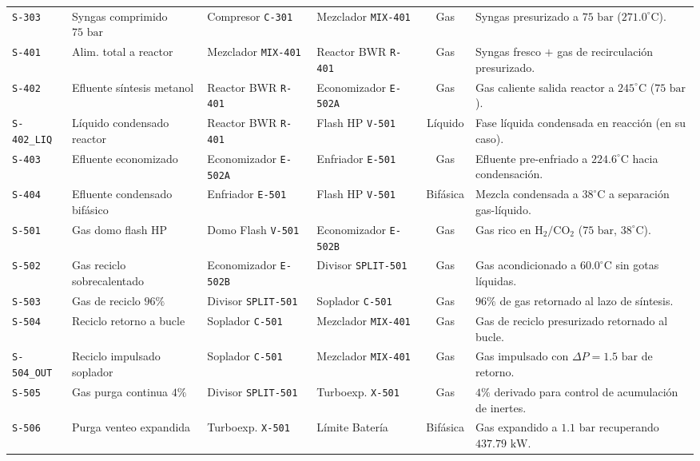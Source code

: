 \documentclass[11pt,letterpaper]{article}
\begin{document}
\begin{xltabular}{\textwidth}{l p{3.1cm} p{2.5cm} p{2.5cm} c X}
\texttt{S-303} & Syngas comprimido $75\text{ bar}$ & Compresor \texttt{C-301} & Mezclador \texttt{MIX-401} & Gas & Syngas presurizado a $75\text{ bar}$ ($271.0^\circ\text{C}$). \\
\texttt{S-401} & Alim. total a reactor & Mezclador \texttt{MIX-401} & Reactor BWR \texttt{R-401} & Gas & Syngas fresco $+$ gas de recirculación presurizado. \\
\texttt{S-402} & Efluente síntesis metanol & Reactor BWR \texttt{R-401} & Economizador \texttt{E-502A} & Gas & Gas caliente salida reactor a $245^\circ\text{C}$ ($75\text{ bar}$). \\
\texttt{S-402\_LIQ} & Líquido condensado reactor & Reactor BWR \texttt{R-401} & Flash HP \texttt{V-501} & Líquido & Fase líquida condensada en reacción (en su caso). \\
\texttt{S-403} & Efluente economizado & Economizador \texttt{E-502A} & Enfriador \texttt{E-501} & Gas & Efluente pre-enfriado a $224.6^\circ\text{C}$ hacia condensación. \\
\texttt{S-404} & Efluente condensado bifásico & Enfriador \texttt{E-501} & Flash HP \texttt{V-501} & Bifásica & Mezcla condensada a $38^\circ\text{C}$ a separación gas-líquido. \\
\texttt{S-501} & Gas domo flash HP & Domo Flash \texttt{V-501} & Economizador \texttt{E-502B} & Gas & Gas rico en $\text{H}_2/\text{CO}_2$ ($75\text{ bar}$, $38^\circ\text{C}$). \\
\texttt{S-502} & Gas reciclo sobrecalentado & Economizador \texttt{E-502B} & Divisor \texttt{SPLIT-501} & Gas & Gas acondicionado a $60.0^\circ\text{C}$ sin gotas líquidas. \\
\texttt{S-503} & Gas de reciclo $96\%$ & Divisor \texttt{SPLIT-501} & Soplador \texttt{C-501} & Gas & $96\%$ de gas retornado al lazo de síntesis. \\
\texttt{S-504} & Reciclo retorno a bucle & Soplador \texttt{C-501} & Mezclador \texttt{MIX-401} & Gas & Gas de reciclo presurizado retornado al bucle. \\
\texttt{S-504\_OUT} & Reciclo impulsado soplador & Soplador \texttt{C-501} & Mezclador \texttt{MIX-401} & Gas & Gas impulsado con $\Delta P = 1.5\text{ bar}$ de retorno. \\
\texttt{S-505} & Gas purga continua $4\%$ & Divisor \texttt{SPLIT-501} & Turboexp. \texttt{X-501} & Gas & $4\%$ derivado para control de acumulación de inertes. \\
\texttt{S-506} & Purga venteo expandida & Turboexp. \texttt{X-501} & Límite Batería & Bifásica & Gas expandido a $1.1\text{ bar}$ recuperando $437.79\text{ kW}$. \\

\end{xltabular}
\end{document}
